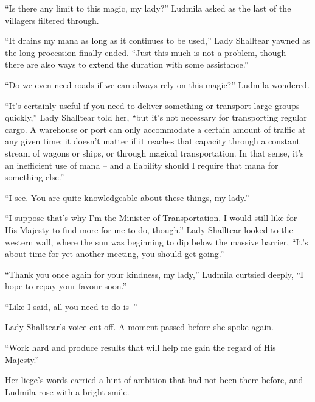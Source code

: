  

“Is there any limit to this magic, my lady?” Ludmila asked as the last of the villagers filtered through.

 

“It drains my mana as long as it continues to be used,” Lady Shalltear yawned as the long procession finally ended. “Just this much is not a problem, though – there are also ways to extend the duration with some assistance.”

 

“Do we even need roads if we can always rely on this magic?” Ludmila wondered.

 

“It’s certainly useful if you need to deliver something or transport large groups quickly,” Lady Shalltear told her, “but it’s not necessary for transporting regular cargo. A warehouse or port can only accommodate a certain amount of traffic at any given time; it doesn’t matter if it reaches that capacity through a constant stream of wagons or ships, or through magical transportation. In that sense, it’s an inefficient use of mana – and a liability should I require that mana for something else.”

 

“I see. You are quite knowledgeable about these things, my lady.”

 

“I suppose that’s why I’m the Minister of Transportation. I would still like for His Majesty to find more for me to do, though.” Lady Shalltear looked to the western wall, where the sun was beginning to dip below the massive barrier, “It’s about time for yet another meeting, you should get going.”

 

“Thank you once again for your kindness, my lady,” Ludmila curtsied deeply, “I hope to repay your favour soon.”

 

“Like I said, all you need to do is–”

 

Lady Shalltear’s voice cut off. A moment passed before she spoke again.

 

“Work hard and produce results that will help me gain the regard of His Majesty.”

 

Her liege’s words carried a hint of ambition that had not been there before, and Ludmila rose with a bright smile.

